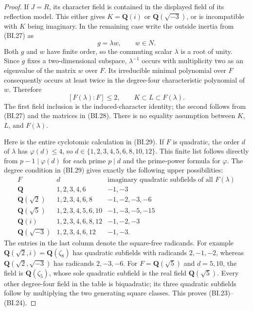 \begin{proof}
If $J=R$, its character field is contained in the displayed field
of its reflection model.  This either gives $K=\mathbf Q(i)$ or
$\mathbf Q(\sqrt{-3})$, or is incompatible with $K$ being imaginary.
In the remaining case write the outside inertia from (BI.27) as
\[
                           g=\lambda w,\qquad w\in N.
\]
Both $g$ and $w$ have finite order, so the commuting scalar
$\lambda$ is a root of unity.  Since $g$ fixes a two-dimensional
subspace, $\lambda^{-1}$ occurs with multiplicity two as an
eigenvalue of the matrix $w$ over $F$.  Its irreducible minimal
polynomial over $F$ consequently occurs at least twice in the
degree-four characteristic polynomial of $w$.  Therefore
\[
                 [F(\lambda):F]\le2,
                 \qquad K\subset L\subset F(\lambda).
                                                               \tag{BI.29}
\]
The first field inclusion is the induced-character identity; the
second follows from (BI.27) and the matrices in (BI.28).
There is no equality assumption between $K$, $L$, and $F(\lambda)$.

Here is the entire cyclotomic calculation in (BI.29).  If $F$ is
quadratic, the order $d$ of $\lambda$ has $\varphi(d)\le4$,
so $d\in\{1,2,3,4,5,6,8,10,12\}$.  This finite list follows
directly from $p-1\mid\varphi(d)$ for each prime $p\mid d$
and the prime-power formula for $\varphi$.  The degree condition
in (BI.29) gives exactly the following upper possibilities:
\[
\begin{array}{c|c|c}
 F&d&\text{imaginary quadratic subfields of all }F(\lambda)\\\hline
 \mathbf Q&1,2,3,4,6&-1,-3\\
 \mathbf Q(\sqrt2)&1,2,3,4,6,8&-1,-2,-3,-6\\
 \mathbf Q(\sqrt5)&1,2,3,4,5,6,10&-1,-3,-5,-15\\
 \mathbf Q(i)&1,2,3,4,6,8,12&-1,-2,-3\\
 \mathbf Q(\sqrt{-3})&1,2,3,4,6,12&-1,-3.
\end{array}                                                    \tag{BI.30}
\]
The entries in the last column denote the square-free radicands.
For example $\mathbf Q(\sqrt2,i)=\mathbf Q(\zeta_8)$ has
quadratic subfields with radicands $2,-1,-2$, whereas
$\mathbf Q(\sqrt2,\sqrt{-3})$ has radicands $2,-3,-6$.
For $F=\mathbf Q(\sqrt5)$ and $d=5,10$, the field is
$\mathbf Q(\zeta_5)$, whose sole quadratic subfield is the real
field $\mathbf Q(\sqrt5)$.  Every other degree-four field in
the table is biquadratic; its three quadratic subfields follow by
multiplying the two generating square classes.  This proves
(BI.23)--(BI.24).


\end{proof}
